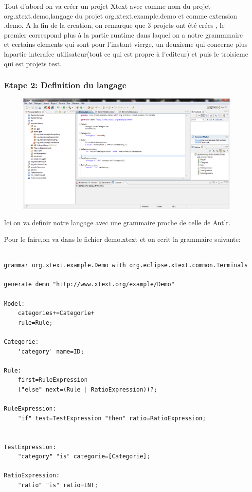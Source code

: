 \documentclass{article}
\begin{document}
Tout d'abord on va créer un projet Xtext avec comme nom du projet org.xtext.demo,langage du projet org.xtext.example.demo et comme extension .demo.
A la fin de la creation, on remarque que 3 projets ont été crées , le premier correspond plus à la partie runtime dans laquel on a notre grammmaire et certains elements qui sont pour l'instant vierge, un deuxieme qui concerne plus lapartie interafce utilisateur(tout ce qui est propre à l'editeur) et puis le troisieme qui est projets test.

\subsubsection{Etape 2: Definition du langage}

\begin{figure}[h]
	\centering
		\includegraphics[width=1.10\textwidth]{2.PNG}
	\label{fig:2}
\end{figure}\FloatBarrier


Ici on va definir notre langage  avec une grammaire proche de celle de Antlr.

Pour le faire,on va dans le fichier demo.xtext et on ecrit la grammaire suivante:

\begin{verbatim}

grammar org.xtext.example.Demo with org.eclipse.xtext.common.Terminals

generate demo "http://www.xtext.org/example/Demo"

Model:
	categories+=Categorie+
	rule=Rule;
	
Categorie:
	'category' name=ID;
	
Rule:
	first=RuleExpression
	("else" next=(Rule | RatioExpression))?;

RuleExpression:
	"if" test=TestExpression "then" ratio=RatioExpression;


TestExpression:
	"category" "is" categorie=[Categorie];

RatioExpression:
	"ratio" "is" ratio=INT;

\end{verbatim}
\end{document}
